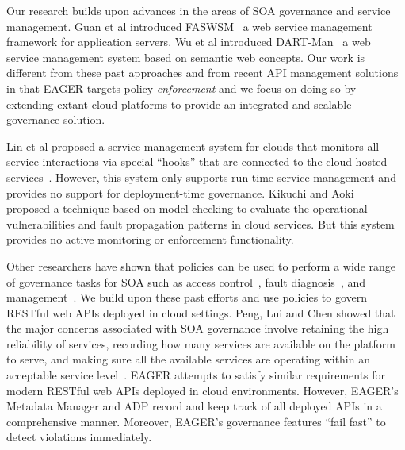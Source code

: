 Our research builds upon advances in the areas of SOA governance and
service management. 
Guan et al introduced FASWSM~\cite{1607141} a web service management
framework for application servers. Wu et al introduced DART-Man~\cite{1504267} a web
service management system based on semantic web concepts. 
Our work is different from these past approaches and 
from recent API management solutions~\cite{wso2am,apigee}
in that EAGER targets policy \textit{enforcement} 
and we focus on doing so by extending extant
cloud platforms to provide an integrated and scalable governance
solution.

Lin et al proposed a service management system for clouds that monitors all
service interactions via special ``hooks'' that are connected to the
cloud-hosted services~\cite{5616981}. However, this system only supports run-time
service management and provides no support for deployment-time governance. 
Kikuchi and Aoki~\cite{6525502} proposed a technique
based on model checking to evaluate the operational vulnerabilities and fault
propagation patterns in cloud services. But this system provides no
active monitoring or enforcement functionality.

Other researchers have shown that policies can be
used to perform a wide range of governance tasks for SOA such as access
control~\cite{4279630}, fault diagnosis~\cite{6154236},
and management~\cite{Suleiman:2009:IUM:1564601.1564730}. We build
upon these past efforts and use policies to govern
RESTful web APIs deployed in cloud settings. 
Peng, Lui and Chen showed that
the major concerns associated with SOA governance 
involve retaining the high reliability of services, recording how many services
are available on the platform to serve, and making sure all the available 
services are operating within an acceptable service
level~\cite{4730489}. EAGER attempts to satisfy similar requirements for 
modern RESTful web APIs deployed in cloud environments. 
However, EAGER's Metadata Manager and ADP record and keep track of all deployed APIs 
in a comprehensive manner.  Moreover, EAGER's governance features 
``fail fast'' to detect violations immediately.


%
